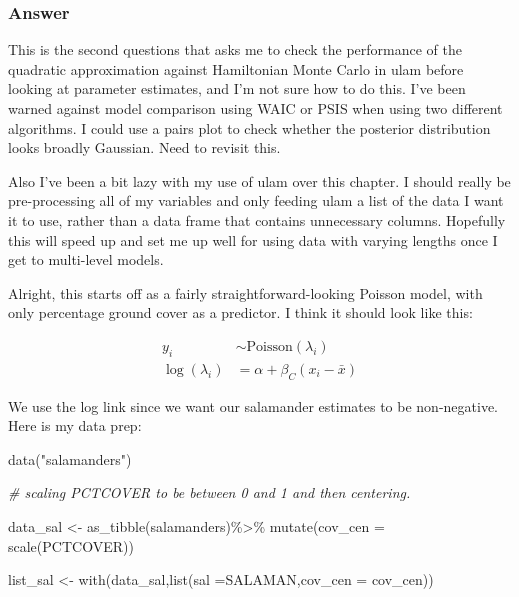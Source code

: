 \documentclass[
]{book}
\newenvironment{Shaded}{\begin{snugshade}}{\end{snugshade}}
\newcommand{\AttributeTok}[1]{\textcolor[rgb]{0.77,0.63,0.00}{#1}}
\newcommand{\CommentTok}[1]{\textcolor[rgb]{0.56,0.35,0.01}{\textit{#1}}}
\newcommand{\FunctionTok}[1]{\textcolor[rgb]{0.00,0.00,0.00}{#1}}
\newcommand{\NormalTok}[1]{#1}
\newcommand{\OtherTok}[1]{\textcolor[rgb]{0.56,0.35,0.01}{#1}}
\newcommand{\SpecialCharTok}[1]{\textcolor[rgb]{0.00,0.00,0.00}{#1}}
\newcommand{\StringTok}[1]{\textcolor[rgb]{0.31,0.60,0.02}{#1}}
\begin{document}
\hypertarget{answer-95}{%
\subsubsection*{Answer}\label{answer-95}}

This is the second questions that asks me to check the performance of the quadratic approximation against Hamiltonian Monte Carlo in ulam before looking at parameter estimates, and I'm not sure how to do this. I've been warned against model comparison using WAIC or PSIS when using two different algorithms. I could use a pairs plot to check whether the posterior distribution looks broadly Gaussian. Need to revisit this.

Also I've been a bit lazy with my use of ulam over this chapter. I should really be pre-processing all of my variables and only feeding ulam a list of the data I want it to use, rather than a data frame that contains unnecessary columns. Hopefully this will speed up and set me up well for using data with varying lengths once I get to multi-level models.

Alright, this starts off as a fairly straightforward-looking Poisson model, with only percentage ground cover as a predictor. I think it should look like this:

\[
\begin{aligned}
y_i &\sim \text{Poisson}(\lambda_i) \\
\log(\lambda_i) &= \alpha + \beta_{C}(x_i-\bar{x})
\end{aligned}
\]

We use the log link since we want our salamander estimates to be non-negative. Here is my data prep:

\begin{Shaded}
\begin{Highlighting}[]
\FunctionTok{data}\NormalTok{(}\StringTok{"salamanders"}\NormalTok{)}

\CommentTok{\# scaling PCTCOVER to be between 0 and 1 and then centering.}

\NormalTok{data\_sal }\OtherTok{\textless{}{-}} \FunctionTok{as\_tibble}\NormalTok{(salamanders)}\SpecialCharTok{\%\textgreater{}\%}
  \FunctionTok{mutate}\NormalTok{(}\AttributeTok{cov\_cen =} \FunctionTok{scale}\NormalTok{(PCTCOVER))}

\NormalTok{list\_sal }\OtherTok{\textless{}{-}} \FunctionTok{with}\NormalTok{(data\_sal,}\FunctionTok{list}\NormalTok{(}\AttributeTok{sal =}\NormalTok{SALAMAN,}\AttributeTok{cov\_cen =}\NormalTok{ cov\_cen)) }
\end{Highlighting}
\end{Shaded}
\end{document}
